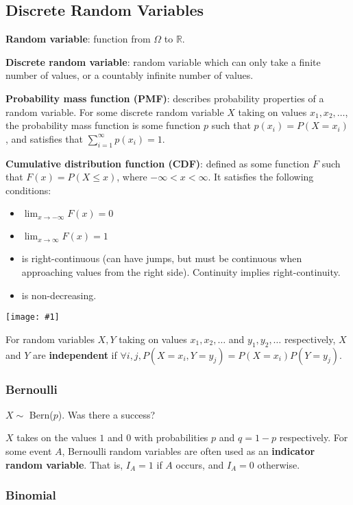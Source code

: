 \documentclass[a4paper,10pt]{article}
\newcommand{\fig}[1]{\centerline{\texttt{[image: \#1]}}}
\newcommand{\R}{\mathbb{R}}
\begin{document}
\subsection{Discrete Random Variables}

\textbf{Random variable}: function from $\Omega$ to $\R$. 

\textbf{Discrete random variable}: random variable which can only take a finite number of values, or a countably infinite number of values. 

\textbf{Probability mass function (PMF)}: describes probability properties of a random variable. For some discrete random variable $X$ taking on values $x_1, x_2, \ldots$, the probability mass function is some function $p$ such that $p(x_i) = P(X=x_i)$, and satisfies that $\sum_{i=1}^{\infty} p(x_i) = 1$.

\textbf{Cumulative distribution function (CDF)}: defined as some function $F$ such that $F(x) = P(X \leq x)$, where $-\infty < x < \infty$. It satisfies the following conditions:

\begin{itemize}
    \item $\lim_{x\to-\infty} F(x) = 0$
    \item $\lim_{x\to\infty} F(x) = 1$
    \item is right-continuous (can have jumps, but must be continuous when approaching values from the right side). Continuity implies right-continuity. 
    \item is non-decreasing. 
\end{itemize}

\fig{pmfcdf}

For random variables $X, Y$ taking on values $x_1, x_2, \ldots$ and $y_1, y_2, \ldots$ respectively, $X$ and $Y$ are \textbf{independent} if $\forall i, j, P(X=x_i, Y=y_j) = P(X=x_i)P(Y=y_j)$. 

\subsubsection{Bernoulli}

$X \sim$ Bern($p$). Was there a success?

$X$ takes on the values $1$ and $0$ with probabilities $p$ and $q=1-p$ respectively. For some event $A$, Bernoulli random variables are often used as an \textbf{indicator random variable}. That is, $I_A=1$ if $A$ occurs, and $I_A=0$ otherwise. 

\subsubsection{Binomial}
\end{document}
